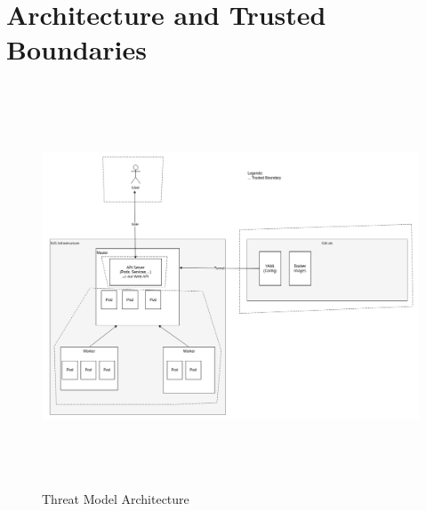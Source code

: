\section{Architecture and Trusted Boundaries}

\begin{figure}[h]
    \centering
    \caption{\label{fig:threat-model-architecture}Threat Model Architecture}
    \includegraphics[height=12cm]{resources/architecture_threat_model.png}
\end{figure}


\newpage
